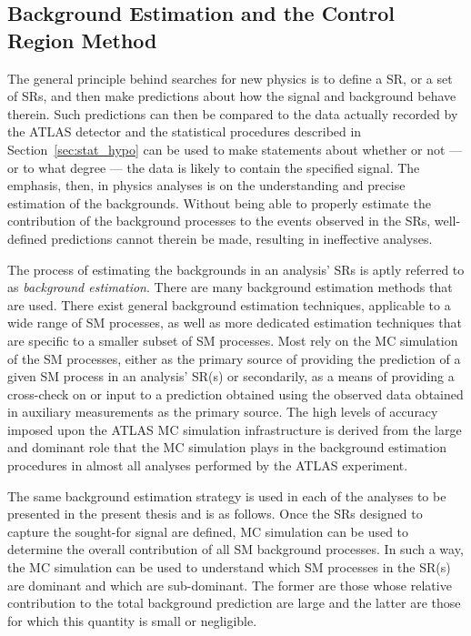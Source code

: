 \FloatBarrier
\subsection{Background Estimation and the Control Region Method}
\label{sec:control_region_method}

The general principle behind searches for new physics is to define a SR, or a set of SRs,
and then make predictions about how the signal and background behave therein.
Such predictions can then be compared to the data actually recorded by the ATLAS detector
and the statistical procedures described in Section~\ref{sec:stat_hypo} can be used to
make statements about whether or not --- or to what degree --- the data is likely to contain the specified signal.
The emphasis, then, in physics analyses is on the understanding and precise estimation of the backgrounds.
Without being able to properly estimate the contribution of the background processes to the
events observed in the SRs, well-defined predictions cannot therein be made, resulting in ineffective
analyses.

The process of estimating the backgrounds in an analysis' SRs is aptly referred to as
\textit{background estimation}.
There are many background estimation methods that are used.
There exist general background estimation techniques, applicable to a wide range of SM processes,
as well as more dedicated estimation techniques that are specific to a smaller subset of
SM processes.
Most rely on the MC simulation of the SM processes, either as the primary source of providing
the prediction of a given SM process in an analysis' SR(s) or secondarily, as a means of providing a
cross-check on or input to a prediction obtained using the observed data obtained in auxiliary measurements as the primary source.
The high levels of accuracy imposed upon the ATLAS MC simulation infrastructure is derived
from the large and dominant role that the MC simulation plays in the background estimation
procedures in almost all analyses performed by the ATLAS experiment.

The same background estimation strategy is used in each of the analyses to be presented in the
present thesis and is as follows.
Once the SRs designed to capture the sought-for signal are defined, MC simulation can be
used to determine the overall contribution of all SM background processes.
In such a way, the MC simulation can be used to understand which SM processes in the SR(s)
are dominant and which are sub-dominant.
The former are those whose relative contribution to the total background prediction
are large and the latter are those for which this quantity is small or negligible.

